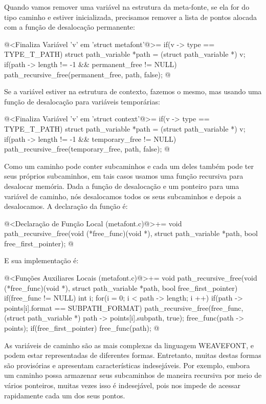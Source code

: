Quando vamos remover uma variável na estrutura da meta-fonte, se ela
for do tipo caminho e estiver inicializada, precisamos remover a lista
de pontos alocada com a função de desalocação permanente:

\iniciocodigo
@<Finaliza Variável 'v' em 'struct metafont'@>=
if(v -> type == TYPE_T_PATH){
  struct path_variable *path = (struct path_variable *) v;  
  if(path -> length != -1 && permanent_free != NULL)
    path_recursive_free(permanent_free, path, false);
}
@
\fimcodigo

Se a variável estiver na estrutura de contexto, fazemos o mesmo, mas
usando uma função de desalocação para variáveis temporárias:


\iniciocodigo
@<Finaliza Variável 'v' em 'struct context'@>=
if(v -> type == TYPE_T_PATH){
  struct path_variable *path = (struct path_variable *) v;
  if(path -> length != -1 && temporary_free != NULL)
    path_recursive_free(temporary_free, path, false);
}
@
\fimcodigo

Como um caminho pode conter subcaminhos e cada um deles também pode
ter seus próprios subcaminhos, em tais casos usamos uma função
recursiva para desalocar memória. Dada a função de desalocação e um
ponteiro para uma variável de caminho, nós desalocamos todos os seus
subcaminhos e depois a desalocamos. A declaração da função é:

\iniciocodigo
@<Declaração de Função Local (metafont.c)@>+=
void path_recursive_free(void (*free_func)(void *),
                         struct path_variable *path,
                         bool free_first_pointer);
@
\fimcodigo

E sua implementação é:

\iniciocodigo
@<Funções Auxiliares Locais (metafont.c)@>+=
void path_recursive_free(void (*free_func)(void *),
                         struct path_variable *path,
                         bool free_first_pointer){
  if(free_func != NULL){
    int i;
    for(i = 0; i < path -> length; i ++){
      if(path -> points[i].format == SUBPATH_FORMAT)
        path_recursive_free(free_func, (struct path_variable *)
                                       path -> points[i].subpath, true);
    }
    free_func(path -> points);
    if(free_first_pointer)
      free_func(path);
  }
}
@
\fimcodigo


As variáveis de caminho são as mais complexas da linguagem WEAVEFONT,
e podem estar representadas de diferentes formas. Entretanto, muitas
destas formas são provisórias e apresentam características
indesejáveis. Por exemplo, embora um caminho possa armazenar seus
subcaminhos de maneira recursiva por meio de vários ponteiros, muitas
vezes isso é indesejável, pois nos impede de acessar rapidamente cada
um dos seus pontos.

